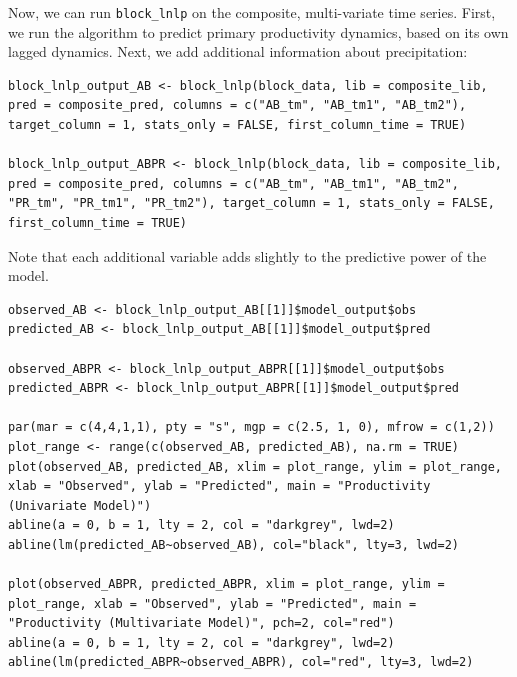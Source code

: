 Now, we can run \lstinline{block_lnlp} on the composite, multi-variate time series. First, we run the algorithm to predict primary productivity dynamics, based on its own lagged dynamics. Next, we add additional information about precipitation:

\begin{lstlisting}
block_lnlp_output_AB <- block_lnlp(block_data, lib = composite_lib, pred = composite_pred, columns = c("AB_tm", "AB_tm1", "AB_tm2"), target_column = 1, stats_only = FALSE, first_column_time = TRUE)

block_lnlp_output_ABPR <- block_lnlp(block_data, lib = composite_lib, pred = composite_pred, columns = c("AB_tm", "AB_tm1", "AB_tm2", "PR_tm", "PR_tm1", "PR_tm2"), target_column = 1, stats_only = FALSE, first_column_time = TRUE)
\end{lstlisting}

Note that each additional variable adds slightly to the predictive power of the model.

\begin{lstlisting}
observed_AB <- block_lnlp_output_AB[[1]]$model_output$obs
predicted_AB <- block_lnlp_output_AB[[1]]$model_output$pred

observed_ABPR <- block_lnlp_output_ABPR[[1]]$model_output$obs
predicted_ABPR <- block_lnlp_output_ABPR[[1]]$model_output$pred

par(mar = c(4,4,1,1), pty = "s", mgp = c(2.5, 1, 0), mfrow = c(1,2))
plot_range <- range(c(observed_AB, predicted_AB), na.rm = TRUE)
plot(observed_AB, predicted_AB, xlim = plot_range, ylim = plot_range, xlab = "Observed", ylab = "Predicted", main = "Productivity (Univariate Model)")
abline(a = 0, b = 1, lty = 2, col = "darkgrey", lwd=2)
abline(lm(predicted_AB~observed_AB), col="black", lty=3, lwd=2)

plot(observed_ABPR, predicted_ABPR, xlim = plot_range, ylim = plot_range, xlab = "Observed", ylab = "Predicted", main = "Productivity (Multivariate Model)", pch=2, col="red")
abline(a = 0, b = 1, lty = 2, col = "darkgrey", lwd=2)
abline(lm(predicted_ABPR~observed_ABPR), col="red", lty=3, lwd=2)
\end{lstlisting}

